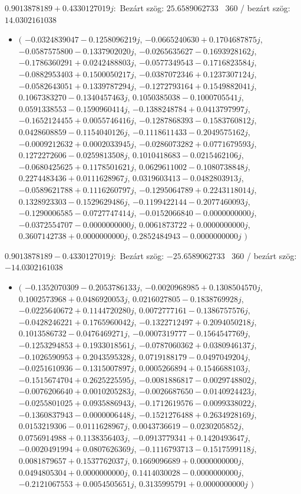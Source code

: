 \documentclass[14pt,a4paper]{article}
\begin{document}
$0.9013878189+0.4330127019j$:\
Bezárt szög: $25.6589062733$ \
360 / bezárt szög: $14.0302161038$\
\begin{itemize}
\item
$\big($
$-0.0324839047-0.1258096219j$, $-0.0665240630+0.1704687875j$, $-0.0587575800-0.1337902020j$, $-0.0265635627-0.1693928162j$, $-0.1786360291+0.0242488803j$, $-0.0577349543-0.1716823584j$, $-0.0882953403+0.1500050217j$, $-0.0387072346+0.1237307124j$, $-0.0582643051+0.1339787294j$, $-0.1272793164+0.1549882041j$, $0.1067383270-0.1340457463j$, $0.1050385038-0.1000705541j$, $0.0591338553-0.1590960414j$, $-0.1388248784+0.0413797997j$, $-0.1652124455+0.0055746416j$, $-0.1287868393-0.1583760812j$, $0.0428608859-0.1154040126j$, $-0.1118611433-0.2049575162j$, $-0.0009212632+0.0002033945j$, $-0.0286073282+0.0771679593j$, $0.1272272606-0.0259813508j$, $0.1010418683-0.0215462106j$, $-0.0680425625+0.1178501621j$, $0.0629611002-0.1080738848j$, $0.2274483436+0.0111628967j$, $0.0319603413-0.0482803913j$, $-0.0589621788+0.1116260797j$, $-0.1295064789+0.2243118014j$, $0.1328923303-0.1529629486j$, $-0.1199422144-0.2077460093j$, $-0.1290006585-0.0727747414j$, $-0.0152066840-0.0000000000j$, $-0.0372554707-0.0000000000j$, $0.0061873722+0.0000000000j$, $0.3607142738+0.0000000000j$, $0.2852484943-0.0000000000j$
$\big)$
\end{itemize}
$0.9013878189-0.4330127019j$:\
Bezárt szög: $-25.6589062733$ \
360 / bezárt szög: $-14.0302161038$\
\begin{itemize}
\item
$\big($
$-0.1352070309-0.2053786133j$, $-0.0020968985+0.1308504570j$, $0.1002573968+0.0486920053j$, $0.0216027805-0.1838769928j$, $-0.0225640672+0.1144720280j$, $0.0072777161-0.1386757576j$, $-0.0428246221+0.1765960042j$, $-0.1322712497+0.2094050218j$, $0.1013586732-0.0476469271j$, $-0.0007319777-0.1564547769j$, $-0.1253294853+0.1933018561j$, $-0.0787060362+0.0380946137j$, $-0.1026590953+0.2043595328j$, $0.0719188179-0.0497049204j$, $-0.0251610936-0.1315007897j$, $0.0005266894+0.1546688103j$, $-0.1515674704+0.2625225595j$, $-0.0081886817-0.0029748802j$, $-0.0076206640+0.0010205283j$, $-0.0026687650-0.0140924423j$, $-0.0255801025+0.0935886943j$, $-0.1712619576-0.0099338022j$, $-0.1360837943-0.0000006448j$, $-0.1521276488+0.2634928169j$, $0.0153219306-0.0111628967j$, $0.0043736619-0.0230205852j$, $0.0756914988+0.1138356403j$, $-0.0913779341+0.1420493647j$, $-0.0020491994+0.0807626369j$, $-0.1116793713-0.1517599118j$, $0.0081879657+0.1537762037j$, $0.1669096689+0.0000000000j$, $0.0494805304+0.0000000000j$, $0.1414030028-0.0000000000j$, $-0.2121067553+0.0054505651j$, $0.3135995791+0.0000000000j$
$\big)$
\end{itemize}
\end{document}
